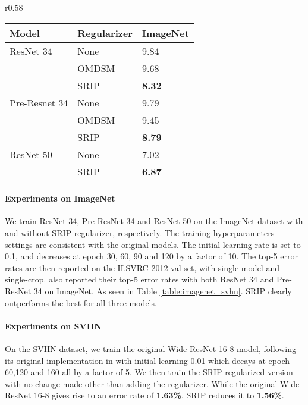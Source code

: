 \documentclass{article}
\begin{document}
\begin{wraptable}{r}{0.58\textwidth}
    \center
        \vspace{-2em}
        \caption{Top-5 error rate comparison on ImageNet.}
        \label{table:imagenet_svhn}
        \begin{tabular}{lll}
            \hline
            Model & Regularizer  & ImageNet \\
            \hline
            ResNet 34 \cite{he2016deep}  & None & 9.84 \\
            & OMDSM \cite{huang2017orthogonal}&9.68\\
            & SRIP & \textbf{8.32} \\
            \hline
            Pre-Resnet 34 \cite{he2016identity}  & None & 9.79 \\
            & OMDSM \cite{huang2017orthogonal}&9.45\\
            & SRIP & \textbf{8.79}  \\
             \hline
            ResNet 50 \cite{he2016deep} & None & 7.02 \\
            & SRIP  & \textbf{6.87}  \\
            \hline
        \end{tabular}
    \vspace{-1em}
\end{wraptable}

\vspace{-0.8em}
\paragraph{Experiments on ImageNet} We train ResNet 34, Pre-ResNet 34 and ResNet 50 \cite{he2016identity} on the ImageNet dataset with and without SRIP regularizer, respectively. The training hyperparameters settings are consistent with the original models. The initial learning rate is set to 0.1, and decreases at epoch 30, 60, 90 and 120 by a factor of 10. %
The top-5 error rates are then reported on the ILSVRC-2012 val set, with single model and single-crop. \cite{huang2017orthogonal} also reported their top-5 error rates with both ResNet 34 and Pre-ResNet 34 on ImageNet. As seen in Table \ref{table:imagenet_svhn}.
SRIP clearly outperforms the best for all three models.


\vspace{-0.8em}
\paragraph{Experiments on SVHN} On the SVHN dataset, we train the original Wide ResNet 16-8 model, following its original implementation in \cite{zagoruyko2016wide} with initial learning 0.01 which decays at epoch 60,120 and 160 all by a factor of 5. We then train the SRIP-regularized version with no change made other than adding the regularizer. While the original Wide ResNet 16-8 gives rise to an error rate of \textbf{1.63\%}, SRIP reduces it to \textbf{1.56\%}.
\end{document}
